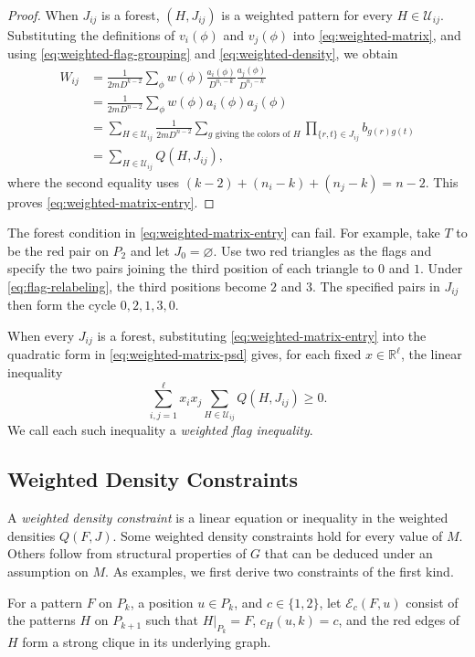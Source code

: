 \documentclass[preprint,11pt,numbers]{elsarticle-arxiv}
\numberwithin{equation}{section}
\theoremstyle{definition}
\begin{document}
\begin{proof}
When $J_{ij}$ is a forest, $(H,J_{ij})$ is a weighted pattern for
every $H\in\mathcal U_{ij}$. Substituting the definitions of
$v_i(\phi)$ and $v_j(\phi)$ into \eqref{eq:weighted-matrix}, and
using \eqref{eq:weighted-flag-grouping} and \eqref{eq:weighted-density},
we obtain
\[
\begin{aligned}
 W_{ij}
 &=\frac{1}{2mD^{k-2}}\sum_\phi
   w(\phi)\frac{a_i(\phi)}{D^{n_i-k}}\frac{a_j(\phi)}{D^{n_j-k}}\\
 &=\frac{1}{2mD^{n-2}}\sum_\phi w(\phi)a_i(\phi)a_j(\phi)\\
 &=\sum_{H\in\mathcal U_{ij}}\frac{1}{2mD^{n-2}}
    \sum_{g\text{ giving the colors of }H}
      \prod_{\{r,t\}\in J_{ij}}b_{g(r)g(t)}\\
 &=\sum_{H\in\mathcal U_{ij}}Q(H,J_{ij}),
\end{aligned}
\]
where the second equality uses $(k-2)+(n_i-k)+(n_j-k)=n-2$.
This proves \eqref{eq:weighted-matrix-entry}.
\end{proof}

The forest condition in \eqref{eq:weighted-matrix-entry} can fail.
For example, take $T$ to be the red pair on $P_2$ and let
$J_0=\varnothing$. Use two red triangles as the flags and specify
the two pairs joining the third position of each triangle to $0$
and $1$. Under \eqref{eq:flag-relabeling}, the third positions become
$2$ and $3$. The specified pairs in $J_{ij}$ then form the cycle
$0,2,1,3,0$.

When every $J_{ij}$ is a forest, substituting
\eqref{eq:weighted-matrix-entry} into the quadratic form in
\eqref{eq:weighted-matrix-psd} gives, for each fixed
$x\in\mathbb R^\ell$, the linear inequality
\[
 \sum_{i,j=1}^{\ell}x_ix_j
      \sum_{H\in\mathcal U_{ij}}Q(H,J_{ij})\geq0 .
\]
We call each such inequality a \emph{weighted flag inequality}.

\subsection{Weighted Density Constraints}\label{subsec:weighted-density-constraints}

A \emph{weighted density constraint} is a linear equation or
inequality in the weighted densities $Q(F,J)$. Some weighted density
constraints hold for every value of $M$. Others follow from structural
properties of $G$ that can be deduced under an assumption on $M$.
As examples, we first derive two constraints of the first kind.

For a pattern $F$ on $P_k$, a position $u\in P_k$, and $c\in\{1,2\}$,
let $\mathcal E_c(F,u)$ consist of the patterns $H$ on $P_{k+1}$
such that $H|_{P_k}=F$, $c_H(u,k)=c$, and the red edges of $H$ form
a strong clique in its underlying graph.
\end{document}
